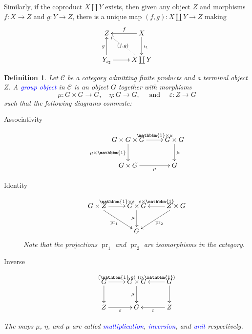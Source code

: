 \documentclass[11pt]{article}
\theoremstyle{thmstyle}
\theoremstyle{defstyle}
\newtheorem{definition}[theorem]{Definition}
\newcommand{\define}[1]{\textcolor{blue}{\textit{#1}}}
\newcommand{\scrC}{\mathscr{C}}
\newcommand{\bbone}{\mathbbm{1}}
\newcommand{\pr}{\operatorname{pr}}
\begin{document}
Similarly, if the coproduct $X\coprod Y$ exists, then given any object $Z$ and morphisms $f\colon X\to Z$ and $g\colon Y\to Z$, there is a unique map $(f, g)\colon X\coprod Y\to Z$ making 
\begin{equation*}
	\xymatrix {
		Z & X\ar[d]^{\iota_1}\ar[l]_{f}\\
		Y_{\iota_2}\ar[r]\ar[u]^{g} & X\coprod Y\ar@{.>}[lu]|-{(f, g)}
	}
\end{equation*}

\begin{definition}
	Let $\scrC$ be a category admitting finite products and a terminal object $Z$. A \define{group object} in $\scrC$ is an object $G$ together with morphisms 
	\begin{equation*}
		\mu\colon G\times G\to G,\quad\eta\colon G\to G,\quad\text{ and }\quad\varepsilon\colon Z\to G
	\end{equation*}
	such that the following diagrams commute: 
	\begin{description}
		\item[Associativity]
		\begin{equation*}
			\xymatrix{
				G\times G\times G\ar[r]^-{\bbone\times\mu}\ar[d]_{\mu\times\bbone} & G\times G\ar[d]^\mu\\
				G\times G\ar[r]_-\mu & G
			}
		\end{equation*}
		\item[Identity]
		\begin{equation*}
			\xymatrix {
				G\times Z\ar[r]^-{\bbone\times\varepsilon}\ar[rd]_-{\pr_1} & G\times G\ar[d]_-{\mu} & Z\times G\ar[l]_-{\varepsilon\times\bbone}\ar[ld]^-{\pr_2}\\
				& G & 
			}
		\end{equation*}
		Note that the projections $\pr_1$ and $\pr_2$ are isomorphisms in the category.
		\item[Inverse] 
		\begin{equation*}
			\xymatrix {
				G\ar[r]^-{(\bbone, \eta)}\ar[d] & G\times G\ar[d]_{\mu} & G\ar[l]_-{(\eta, \bbone)}\ar[d]\\
				Z\ar[r]_\varepsilon & G & Z\ar[l]^\varepsilon
			}
		\end{equation*}
	\end{description}
	The maps $\mu$, $\eta$, and $\mu$ are called \define{multiplication}, \define{inversion}, and \define{unit} respectively.
\end{definition}
\end{document}
